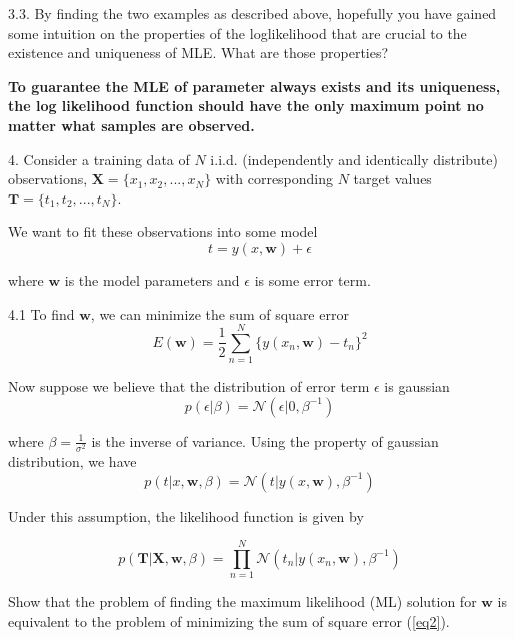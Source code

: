 \documentclass{article}
\theoremstyle{definition}
\theoremstyle{definition}
\theoremstyle{remark}
\begin{document}
3.3. By finding the two examples as described above, hopefully you have gained some intuition on the properties of the loglikelihood that are crucial to the existence and uniqueness of MLE. What are those properties?

\begin{addmargin}[3em]{2em}
  \textbf{To guarantee the MLE of parameter always exists and its uniqueness, the log likelihood function should have the only maximum point no matter what samples are observed.}
\end{addmargin}

4. Consider a training data of $N$ i.i.d. (independently and identically distribute) observations, $\bm X=\{x_1, x_2, ..., x_N\}$ with corresponding $N$ target values $\bm T=\{t_1, t_2, ..., t_N\}$.

We want to fit these observations into some model
\begin{equation}\label{eq1}
t = y(x, \bm w) + \epsilon
\end{equation}

where $\bm w$ is the model parameters and $\epsilon$ is some error term.

4.1 To find $\bm w$, we can minimize the sum of square error
\begin{equation}\label{eq2}
E(\bm w) = \frac{1}{2}\sum_{n=1}^N\{y(x_n, \bm w)-t_n\}^2
\end{equation}

Now suppose we believe that the distribution of error term $\epsilon$ is gaussian
\begin{equation}\label{eq3}
p(\epsilon|\beta) = \mathcal N(\epsilon|0, \beta^{-1})
\end{equation}

where $\beta = \frac{1}{\sigma^2}$ is the inverse of variance. Using the property of gaussian distribution, we have
\begin{equation}\label{eq4}
p(t|x, \bm w, \beta) = \mathcal N(t|y(x, \bm w), \beta^{-1})
\end{equation}

Under this assumption, the likelihood function is given by

\begin{equation}\label{eq5}
p(\bm T|\bm X, \bm w, \beta) = \prod_{n=1}^N \mathcal N(t_n|y(x_n, \bm w), \beta^{-1})
\end{equation}

Show that the problem of finding the maximum likelihood (ML) solution for $\bm w$ is equivalent to the problem of minimizing the sum of square error (\ref{eq2}).
\end{document}
